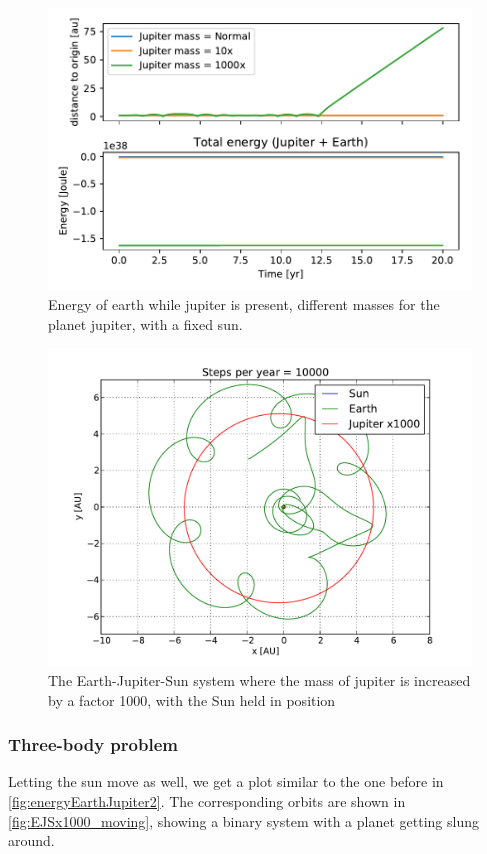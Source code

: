 \documentclass[10pt]{article}
\begin{document}
\begin{multicols}{2}
\begin{figure}[H]
    \centering
    \includegraphics[width=0.8\linewidth]{energyEarthJupiter.pdf}
    \caption{Energy of earth while jupiter is present, different masses for
        the planet jupiter, with a fixed sun.  }
    \label{fig:energyEarthJupiter}
\end{figure}

\begin{figure}[H]
    \centering
    \includegraphics[width=1.0\linewidth]{../results/EJSx1000_1.pdf}
    \caption{The Earth-Jupiter-Sun system where the mass of jupiter is
    increased by a factor 1000, with the Sun held in position}
    \label{fig:jupiter1000x}
\end{figure}

\subsubsection{Three-body problem}
Letting the sun move as well, we get a plot similar to the one before in
\cref{fig:energyEarthJupiter2}. The corresponding orbits are shown in
\cref{fig:EJSx1000_moving}, showing a binary system with a planet getting
slung around.


\end{multicols}
\end{document}
